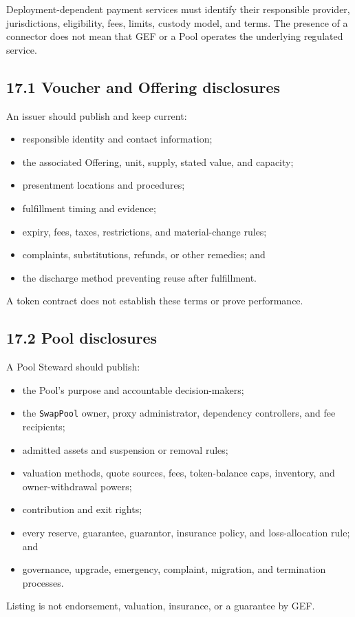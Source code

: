 \documentclass[11pt]{article}
\begin{document}
Deployment-dependent payment services must identify their responsible provider, jurisdictions, eligibility, fees, limits, custody model, and terms. The presence of a connector does not mean that GEF or a Pool operates the underlying regulated service.

\subsection*{17.1 Voucher and Offering disclosures}

An issuer should publish and keep current:

\begin{itemize}[leftmargin=*]
\item responsible identity and contact information;
\item the associated Offering, unit, supply, stated value, and capacity;
\item presentment locations and procedures;
\item fulfillment timing and evidence;
\item expiry, fees, taxes, restrictions, and material-change rules;
\item complaints, substitutions, refunds, or other remedies; and
\item the discharge method preventing reuse after fulfillment.
\end{itemize}
A token contract does not establish these terms or prove performance.

\subsection*{17.2 Pool disclosures}

A Pool Steward should publish:

\begin{itemize}[leftmargin=*]
\item the Pool's purpose and accountable decision-makers;
\item the \texttt{SwapPool} owner, proxy administrator, dependency controllers, and fee recipients;
\item admitted assets and suspension or removal rules;
\item valuation methods, quote sources, fees, token-balance caps, inventory, and owner-withdrawal powers;
\item contribution and exit rights;
\item every reserve, guarantee, guarantor, insurance policy, and loss-allocation rule; and
\item governance, upgrade, emergency, complaint, migration, and termination processes.
\end{itemize}
Listing is not endorsement, valuation, insurance, or a guarantee by GEF.
\end{document}
